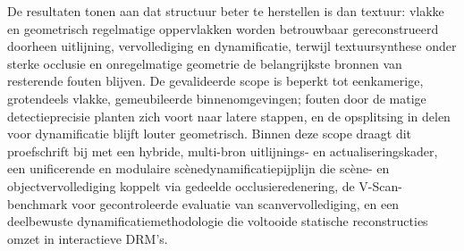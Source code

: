 De resultaten tonen aan dat structuur beter te herstellen is dan textuur: vlakke en geometrisch regelmatige oppervlakken worden betrouwbaar gereconstrueerd doorheen uitlijning, vervollediging en dynamificatie, terwijl textuursynthese onder sterke occlusie en onregelmatige geometrie de belangrijkste bronnen van resterende fouten blijven. De gevalideerde scope is beperkt tot eenkamerige, grotendeels vlakke, gemeubileerde binnenomgevingen; fouten door de matige detectieprecisie planten zich voort naar latere stappen, en de opsplitsing in delen voor dynamificatie blijft louter geometrisch. Binnen deze scope draagt dit proefschrift bij met een hybride, multi-bron uitlijnings- en actualiseringskader, een unificerende en modulaire scènedynamificatiepijplijn die scène- en objectvervollediging koppelt via gedeelde occlusieredenering, de V-Scan-benchmark voor gecontroleerde evaluatie van scanvervollediging, en een deelbewuste dynamificatiemethodologie die voltooide statische reconstructies omzet in interactieve DRM's.

\cleardoublepage

